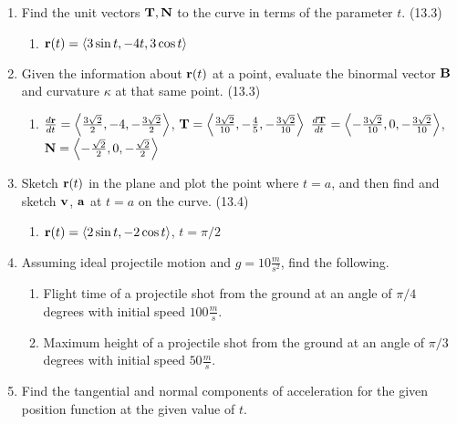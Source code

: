 \begin{enumerate}
    \item Find the unit vectors $\mathbf{T},\mathbf{N}$ to the curve in terms of the parameter $t$. (13.3)

      \begin{enumerate}
        \item $\mathbf{r}(t) = \left< 3\sin t, -4t, 3\cos t \right>$
      \end{enumerate}

    \item Given the information about $\mathbf{r}(t)$ at a point, evaluate the binormal vector $\mathbf{B}$ and curvature $\kappa$ at that same point. (13.3)

      \begin{enumerate}
        \item $\frac{d\mathbf{r}}{dt}=\left< \frac{3\sqrt{2}}{2}, -4, -\frac{3\sqrt{2}}{2}\right>$, $\mathbf{T}=\left< \frac{3\sqrt{2}}{10}, -\frac{4}{5}, -\frac{3\sqrt{2}}{10}\right>$ \newline $\frac{d\mathbf{T}}{dt}=\left<-\frac{3\sqrt{2}}{10},0,-\frac{3\sqrt{2}}{10}\right>$, $\mathbf{N}=\left<-\frac{\sqrt{2}}{2},0,-\frac{\sqrt{2}}{2}\right>$
      \end{enumerate}

    \item Sketch $\mathbf{r}(t)$ in the plane and plot the point where $t=a$, and then find and sketch $\mathbf{v}$, $\mathbf{a}$ at $t=a$ on the curve. (13.4)

      \begin{enumerate}
        \item $\mathbf{r}(t) = \left<2\sin t,-2\cos t\right>$, $t=\pi/2$
      \end{enumerate}

    \item Assuming ideal projectile motion and $g=10\frac{m}{s^2}$, find the following.

      \begin{enumerate}
        \item Flight time of a projectile shot from the ground at an angle of $\pi/4$ degrees with initial speed $100\frac{m}{s}$.
        \item Maximum height of a projectile shot from the ground at an angle of $\pi/3$ degrees with initial speed $50\frac{m}{s}$.
      \end{enumerate}

    \item Find the tangential and normal components of acceleration for the given position function at the given value of $t$.


\end{enumerate}
